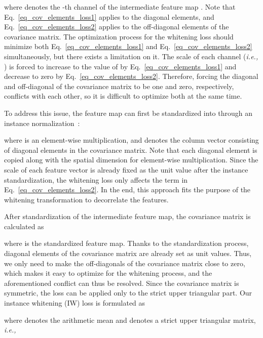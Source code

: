 \documentclass[final]{latex/cvpr}
\begin{document}
where  denotes the -th channel of the intermediate feature map . 
Note that Eq.~\eqref{eq_cov_elements_loss1} applies to the diagonal elements, and Eq.~\eqref{eq_cov_elements_loss2} applies to the off-diagonal elements of the covariance matrix.
The optimization process for the whitening loss should minimize both Eq.~\eqref{eq_cov_elements_loss1} and Eq.~\eqref{eq_cov_elements_loss2} simultaneously, but there exists a limitation on it.
The scale of each channel (\textit{i.e.,} ) is forced to increase to the value of  by Eq.~\eqref{eq_cov_elements_loss1} and decrease to zero by Eq.~\eqref{eq_cov_elements_loss2}. 
Therefore, forcing the diagonal and off-diagonal of the covariance matrix to be one and zero, respectively, conflicts with each other, so it is difficult to optimize both at the same time.


To address this issue, the feature map  can first be standardized into  through an instance normalization~\cite{ulyanov2016instance}:
\vspace{-0.1cm}

where  is an element-wise multiplication, and  denotes the column vector consisting of diagonal elements in the covariance matrix. Note that each diagonal element is copied along with the spatial dimension  for element-wise multiplication.
Since the scale of each feature vector is already fixed as the unit value after the instance standardization, the whitening loss only affects the  term in Eq.~\eqref{eq_cov_elements_loss2}. In the end, this approach fits the purpose of the whitening transformation to decorrelate the features.

After standardization of the intermediate feature map, the covariance matrix is calculated as

where  is the standardized feature map.
Thanks to the standardization process, diagonal elements of the covariance matrix are already set as unit values. Thus, we only need to make the off-diagonals of the covariance matrix close to zero, which makes it easy to optimize for the whitening process, and the aforementioned conflict can thus be resolved. Since the covariance matrix is symmetric, the loss can be applied only to the strict upper triangular part. Our instance whitening (IW) loss is formulated as

where  denotes the arithmetic mean and  denotes a strict upper triangular matrix, \textit{i.e.,}
\end{document}

